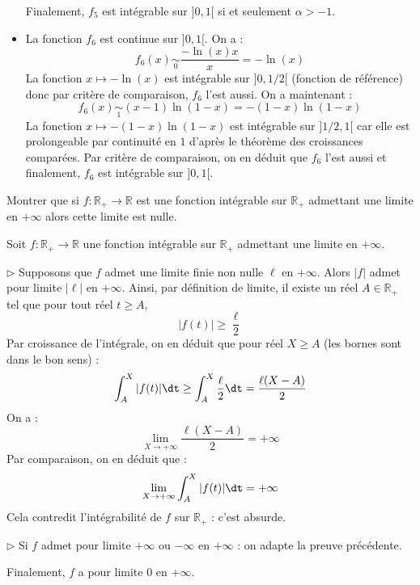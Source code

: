 \documentclass[a4paper,10pt]{report}
\begin{document}
\begin{itemize}
\medskip

\noindent Finalement, $f_5$ est intégrable sur $]0,1[$ si et seulement $\alpha>-1$.
 \item La fonction $f_6$ est continue sur $]0,1[$. On a :
 $$f_6(x) \underset{0}{\sim} \dfrac{- \ln(x) x}{x} = - \ln(x)$$
 La fonction $x \mapsto - \ln(x)$ est intégrable sur $]0,1/2[$ (fonction de référence) donc par critère de comparaison, $f_6$ l'est aussi. On a maintenant :
 $$ f_6(x) \underset{1}{\sim} (x-1) \ln(1-x) = - (1-x)\ln(1-x)$$
 La fonction $x \mapsto -(1-x)\ln(1-x)$ est intégrable sur $]1/2,1[$ car elle est prolongeable par continuité en $1$ d'après le théorème des croissances comparées. Par critère de comparaison, on en déduit que $f_6$ l'est aussi et finalement, $f_6$ est intégrable sur $]0,1[$.
\end{itemize}

\begin{Exercice}{} Montrer que si $f : \mathbb{R}_+ \rightarrow \mathbb{R}$ est une fonction intégrable sur $\mathbb{R}_+$ admettant une limite en $+ \infty$ alors cette limite est nulle. 
\end{Exercice} 

\corr Soit $f : \mathbb{R}_+ \rightarrow \mathbb{R}$ une fonction intégrable sur $\mathbb{R}_+$ admettant une limite en $+ \infty$. 

\medskip

\noindent $\rhd$ Supposons que $f$ admet une limite finie non nulle $\ell$ en $+ \infty$. Alors $\vert f \vert $ admet pour limite $\vert \ell \vert$ en $+ \infty$. Ainsi, par définition de limite, il existe un réel $A \in \mathbb{R}_+$ tel que pour tout réel $t \geq A$,
$$ \vert f(t) \vert \geq \dfrac{\ell}{2}$$
Par croissance de l'intégrale, on en déduit que pour réel $X \geq A$ (les bornes sont dans le bon sens) : 
$$ \int_A^{X} \vert f(t) \vert \dt \geq \int_A^{X} \dfrac{\ell}{2} \dt = \dfrac{\ell(X-A)}{2}$$
On a :
$$ \lim_{X \rightarrow + \infty} \dfrac{\ell(X-A)}{2} = + \infty$$
Par comparaison, on en déduit que :
$$  \lim_{X \rightarrow + \infty} \int_A^{X} \vert f(t) \vert \dt = + \infty$$
Cela contredit l'intégrabilité de $f$ sur $\mathbb{R}_+$ : c'est absurde.

\medskip

\noindent $\rhd$ Si $f$ admet pour limite $+ \infty$ ou $-\infty$ en $+ \infty$ : on adapte la preuve précédente.

\medskip

\noindent Finalement, $f$ a pour limite $0$ en $+ \infty$.
\end{document}

